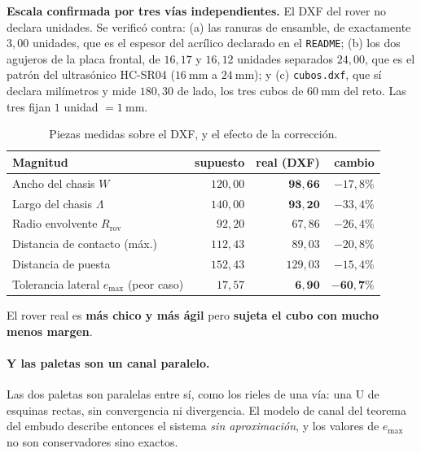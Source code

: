\documentclass[11pt,a4paper]{article}
\begin{document}
\begin{tcolorbox}[colback=black!3,colframe=black!50,boxrule=0.5pt,arc=1pt]
\textbf{Escala confirmada por tres vías independientes.} El DXF del rover no declara
unidades. Se verificó contra: (a) las ranuras de ensamble, de exactamente $3{,}00$
unidades, que es el espesor del acrílico declarado en el \texttt{README}; (b) los dos
agujeros de la placa frontal, de $16{,}17$ y $16{,}12$ unidades separados $24{,}00$,
que es el patrón del ultrasónico HC-SR04 ($16\ \mathrm{mm}$ a $24\ \mathrm{mm}$); y
(c) \texttt{cubos.dxf}, que sí declara milímetros y mide $180{,}30$ de lado, los tres
cubos de $60\ \mathrm{mm}$ del reto. Las tres fijan $1$ unidad $= 1\ \mathrm{mm}$.
\end{tcolorbox}

\begin{table}[htbp]
\centering
\small
\caption{Piezas medidas sobre el DXF, y el efecto de la corrección.}
\begin{tabular}{lrrr}
\toprule
Magnitud & supuesto & real (DXF) & cambio \\
\midrule
Ancho del chasis $W$ & $120{,}00$ & $\mathbf{98{,}66}$ & $-17{,}8\%$ \\
Largo del chasis $\Lambda$ & $140{,}00$ & $\mathbf{93{,}20}$ & $-33{,}4\%$ \\
Radio envolvente $R_{\mathrm{rov}}$ & $92{,}20$ & $67{,}86$ & $-26{,}4\%$ \\
Distancia de contacto (máx.) & $112{,}43$ & $89{,}03$ & $-20{,}8\%$ \\
Distancia de puesta & $152{,}43$ & $129{,}03$ & $-15{,}4\%$ \\
Tolerancia lateral $e_{\max}$ (peor caso) & $17{,}57$ & $\mathbf{6{,}90}$ & $\mathbf{-60{,}7\%}$ \\
\bottomrule
\end{tabular}
\end{table}

El rover real es \textbf{más chico y más ágil} pero \textbf{sujeta el cubo con mucho
menos margen}.

\paragraph{Y las paletas son un canal paralelo.} Las dos paletas son paralelas entre sí,
como los rieles de una vía: una U de esquinas rectas, sin convergencia ni divergencia.
El modelo de canal del teorema del embudo describe entonces el sistema \emph{sin
aproximación}, y los valores de $e_{\max}$ no son conservadores sino exactos.
\end{document}
